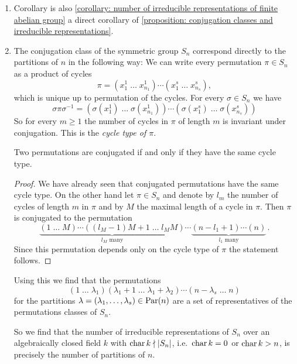 \begin{example}
  \begin{enumerate}[label=\emph{\alph*)}, leftmargin=*]
    \item
      Corollary is also \ref{corollary: number of irreducible representations of finite abelian group} a direct corollary of \ref{proposition: conjugation classes and irreducible representations}.
    \item
      The conjugation class of the symmetric group $S_n$ correspond directly to the partitions of $n$ in the following way:
      We can write every permutation $\pi \in S_n$ as a product of cycles
      \[
          \pi
        =         \left( x^1_1 \; \dots \; x^1_{n_1} \right)
          \dotsm  \left(x^s_1 \; \dots \; x^s_{n_s} \right),
      \]
      which is unique up to permutation of the cycles. For every $\sigma \in S_n$ we have
      \[
          \sigma \pi \sigma^{-1}
        =         \left(
                        \sigma\left( x^1_1 \right)
                    \;  \dotso
                    \;  \sigma\left( x^1_{n_1} \right)
                  \right)
          \dotsm  \left(
                        \sigma\left( x^s_1 \right)
                    \;  \dotso
                    \;  \sigma\left( x^s_{n_s} \right)
                  \right)
      \]
      So for every $m \geq 1$ the number of cycles in $\pi$ of length $m$ is invariant under conjugation.
      This is the \emph{cycle type of $\pi$}.
      
      \begin{claim}
        Two permutations are conjugated if and only if they have the same cycle type.
      \end{claim}
      \begin{proof}
        We have already seen that conjugated permutations have the same cycle type.
        On the other hand let $\pi \in S_n$ and denote by $l_m$ the number of cycles of length $m$ in $\pi$ and by $M$ the maximal length of a cycle in $\pi$.
        Then $\pi$ is conjugated to the permutation
        \[
                  \underbrace{ (1 \; \dots \; M) \dotsm ((l_M-1)M+1 \; \dots \; l_M M) }_{ \text{$l_M$ many} }
          \dotsm  \underbrace{ (n-l_1+1) \dotsm (n) }_{ \text{$l_1$ many} } \,.
        \]
        Since this permutation depends only on the cycle type of $\pi$ the statement follows.
      \end{proof}
      
      Using this we find that the permutations
      \[
                (1 \; \dotso \; \lambda_1)
                (\lambda_1 + 1 \; \dotso \; \lambda_1 + \lambda_2)
        \dotsm  (n-\lambda_s \; \dots \; n)
      \]
      for the partitions $\lambda = (\lambda_1, \dotsc, \lambda_s) \in \operatorname{Par}(n)$ are a set of representatives of the permutations classes of $S_n$.
      
      So we find that the number of irreducible representations of $S_n$ over an algebraically closed field $k$ with $\operatorname{char} k \nmid |S_n|$, i.e.\ $\operatorname{char} k = 0$ or $\operatorname{char} k > n$, is precisely the number of partitions of $n$.
  \end{enumerate}
\end{example}



